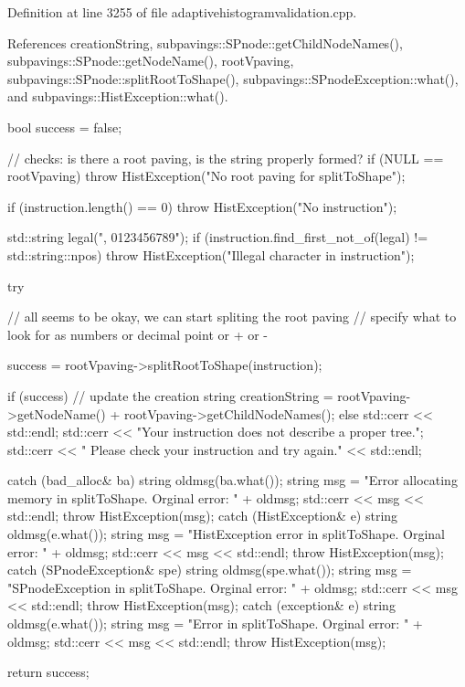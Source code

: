 \-Definition at line 3255 of file adaptivehistogramvalidation.\-cpp.



\-References creation\-String, subpavings\-::\-S\-Pnode\-::get\-Child\-Node\-Names(), subpavings\-::\-S\-Pnode\-::get\-Node\-Name(), root\-Vpaving, subpavings\-::\-S\-Pnode\-::split\-Root\-To\-Shape(), subpavings\-::\-S\-Pnode\-Exception\-::what(), and subpavings\-::\-Hist\-Exception\-::what().


\begin{DoxyCode}
{
    bool success = false;

    // checks:  is there a root paving, is the string properly formed?
    if (NULL == rootVpaving) {
        throw HistException("No root paving for splitToShape");
    }

    if (instruction.length() == 0) {
      throw HistException("No instruction");
    }

    std::string legal(", 0123456789");
    if (instruction.find_first_not_of(legal) != std::string::npos) {
        throw HistException("Illegal character in instruction");
    }

    try { // all seems to be okay, we can start spliting the root paving
        // specify what to look for as numbers or decimal point or + or -

       success = rootVpaving->splitRootToShape(instruction);

        if (success) {
            // update the creation string
            creationString = rootVpaving->getNodeName()
                + rootVpaving->getChildNodeNames();
        }
        else {
            std::cerr << std::endl;
            std::cerr << "Your instruction does not describe a proper tree.";
            std::cerr << "  Please check your instruction and try again."
            << std::endl;
       }
    }

    catch (bad_alloc& ba) {
        string oldmsg(ba.what());
        string msg = "Error allocating memory in splitToShape.  Orginal error: 
      "
                                            + oldmsg;
        std::cerr << msg << std::endl;
        throw HistException(msg);
    }
    catch (HistException& e) {
        string oldmsg(e.what());
        string msg = "HistException error in splitToShape.  Orginal error: "
                                    + oldmsg;
        std::cerr << msg << std::endl;
        throw HistException(msg);
    }
    catch (SPnodeException& spe) {
        string oldmsg(spe.what());
        string msg = "SPnodeException in splitToShape.  Orginal error: " + 
      oldmsg;
        std::cerr << msg << std::endl;
        throw HistException(msg);
    }
    catch (exception& e) {
        string oldmsg(e.what());
        string msg = "Error in splitToShape.  Orginal error: " + oldmsg;
        std::cerr << msg << std::endl;
        throw HistException(msg);
    }

    return success;
}
\end{DoxyCode}


